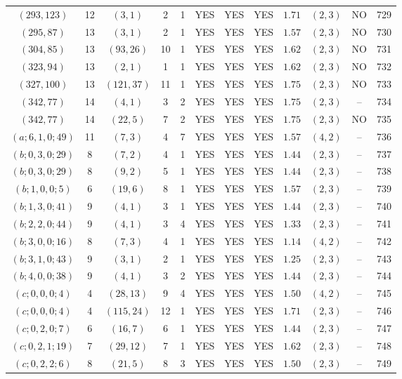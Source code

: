 \begin{longtable}{|c|c|c|c|c|c|c|c|c|c|c|c|}
$(293,123)$ & 12 & $(3,1)$ & 2 & 1 & YES & YES & YES & $1.71$ & $(2,3)$ & NO & 729\\
$(295,87)$ & 13 & $(3,1)$ & 2 & 1 & YES & YES & YES & $1.57$ & $(2,3)$ & NO & 730\\
$(304,85)$ & 13 & $(93,26)$ & 10 & 1 & YES & YES & YES & $1.62$ & $(2,3)$ & NO & 731\\
$(323,94)$ & 13 & $(2,1)$ & 1 & 1 & YES & YES & YES & $1.62$ & $(2,3)$ & NO & 732\\
$(327,100)$ & 13 & $(121,37)$ & 11 & 1 & YES & YES & YES & $1.75$ & $(2,3)$ & NO & 733\\
$(342,77)$ & 14 & $(4,1)$ & 3 & 2 & YES & YES & YES & $1.75$ & $(2,3)$ & -- & 734\\
$(342,77)$ & 14 & $(22,5)$ & 7 & 2 & YES & YES & YES & $1.75$ & $(2,3)$ & NO & 735\\
$(a;6,1,0;49)$ & 11 & $(7,3)$ & 4 & 7 & YES & YES & YES & $1.57$ & $(4,2)$ & -- & 736\\
$(b;0,3,0;29)$ & 8 & $(7,2)$ & 4 & 1 & YES & YES & YES & $1.44$ & $(2,3)$ & -- & 737\\
$(b;0,3,0;29)$ & 8 & $(9,2)$ & 5 & 1 & YES & YES & YES & $1.44$ & $(2,3)$ & -- & 738\\
$(b;1,0,0;5)$ & 6 & $(19,6)$ & 8 & 1 & YES & YES & YES & $1.57$ & $(2,3)$ & -- & 739\\
$(b;1,3,0;41)$ & 9 & $(4,1)$ & 3 & 1 & YES & YES & YES & $1.44$ & $(2,3)$ & -- & 740\\
$(b;2,2,0;44)$ & 9 & $(4,1)$ & 3 & 4 & YES & YES & YES & $1.33$ & $(2,3)$ & -- & 741\\
$(b;3,0,0;16)$ & 8 & $(7,3)$ & 4 & 1 & YES & YES & YES & $1.14$ & $(4,2)$ & -- & 742\\
$(b;3,1,0;43)$ & 9 & $(3,1)$ & 2 & 1 & YES & YES & YES & $1.25$ & $(2,3)$ & -- & 743\\
$(b;4,0,0;38)$ & 9 & $(4,1)$ & 3 & 2 & YES & YES & YES & $1.44$ & $(2,3)$ & -- & 744\\
$(c;0,0,0;4)$ & 4 & $(28,13)$ & 9 & 4 & YES & YES & YES & $1.50$ & $(4,2)$ & -- & 745\\
$(c;0,0,0;4)$ & 4 & $(115,24)$ & 12 & 1 & YES & YES & YES & $1.71$ & $(2,3)$ & -- & 746\\
$(c;0,2,0;7)$ & 6 & $(16,7)$ & 6 & 1 & YES & YES & YES & $1.44$ & $(2,3)$ & -- & 747\\
$(c;0,2,1;19)$ & 7 & $(29,12)$ & 7 & 1 & YES & YES & YES & $1.62$ & $(2,3)$ & -- & 748\\
$(c;0,2,2;6)$ & 8 & $(21,5)$ & 8 & 3 & YES & YES & YES & $1.50$ & $(2,3)$ & -- & 749\\

\end{longtable}
